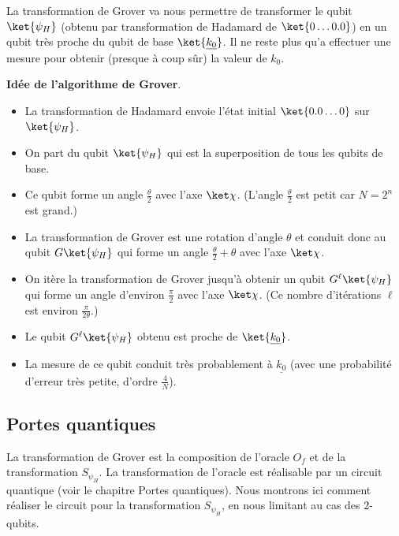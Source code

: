 \documentclass[11pt,class=report,crop=false]{standalone}
\begin{document}
La transformation de Grover va nous permettre de transformer le qubit $\ket{\psi_H}$ (obtenu par transformation de Hadamard de $\ket{0\ldots0.0}$) en un qubit très proche du qubit de base $\ket{\underline{k_0}}$. Il ne reste plus qu'a effectuer une mesure pour obtenir (presque à coup sûr) la valeur de $k_0$.

\bigskip

\textbf{Idée de l'algorithme de Grover}.
\begin{itemize}
  \item La transformation de Hadamard envoie l'état initial $\ket{0.0\ldots0}$ sur $\ket{\psi_H}$.
  
  \item On part du qubit $\ket{\psi_H}$ qui est la superposition de tous les qubits de base.
  
  \item Ce qubit forme un angle $\frac\theta2$ avec l'axe $\ket\chi$.
  (L'angle $\frac\theta2$ est petit car $N=2^n$ est grand.)

  \item La transformation de Grover est une rotation d'angle $\theta$ et conduit donc au qubit $G\ket{\psi_H}$ qui forme un angle $\frac\theta2 + \theta$ avec l'axe $\ket\chi$.

  \item On itère la transformation de Grover jusqu'à obtenir un qubit $G^\ell \ket{\psi_H}$ qui forme un angle d'environ $\frac\pi2$ avec l'axe $\ket\chi$. (Ce nombre d'itérations $\ell$ est environ $\frac{\pi}{2\theta}$.)

  \item Le qubit $G^\ell \ket{\psi_H}$ obtenu est proche de $\ket{\underline{k_0}}$.

  \item La mesure de ce qubit conduit très probablement à $\underline{k_0}$ (avec une probabilité d'erreur très petite, d'ordre $\frac4N$).
\end{itemize}

\subsection{Portes quantiques}

La transformation de Grover est la composition de l'oracle $O_f$ et de la transformation $S_{\psi_H}$.
La transformation de l'oracle est réalisable par un circuit quantique (voir le chapitre \og{}Portes quantiques\fg{}). Nous montrons ici comment réaliser le circuit pour la transformation $S_{\psi_H}$, en nous limitant au cas des $2$-qubits.
\end{document}

